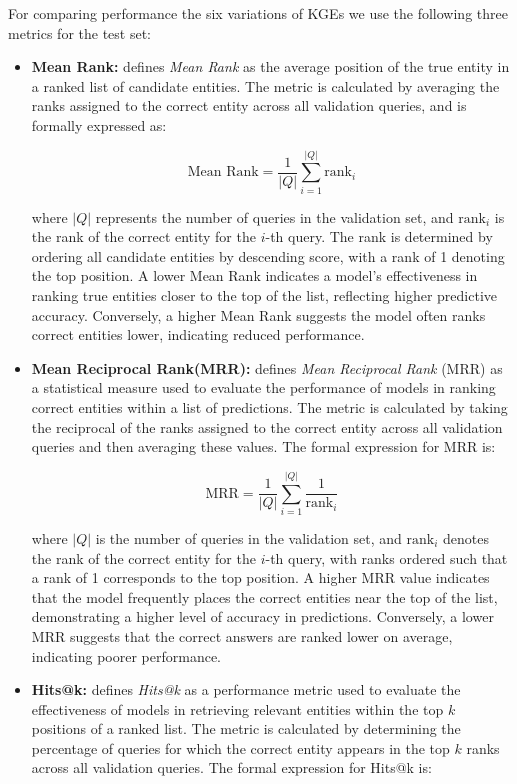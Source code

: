 \documentclass{article}
\begin{document}
For comparing performance the six variations of KGEs we use the following three metrics for the test set:
\begin{itemize}
    \item \textbf{Mean Rank:} \textcite{bordes2013translating} defines \textit{Mean Rank} as the average position of the true entity in a ranked list of candidate entities. The metric is calculated by averaging the ranks assigned to the correct entity across all validation queries, and is formally expressed as:

\[
\text{Mean Rank} = \frac{1}{|Q|} \sum_{i=1}^{|Q|} \text{rank}_i
\]

where \( |Q| \) represents the number of queries in the validation set, and \( \text{rank}_i \) is the rank of the correct entity for the \(i\)-th query. The rank is determined by ordering all candidate entities by descending score, with a rank of 1 denoting the top position. A lower Mean Rank indicates a model's effectiveness in ranking true entities closer to the top of the list, reflecting higher predictive accuracy. Conversely, a higher Mean Rank suggests the model often ranks correct entities lower, indicating reduced performance.
 
    \item \textbf{Mean Reciprocal Rank(MRR):}  \textcite{yang2015embedding} defines \textit{Mean Reciprocal Rank} (MRR) as a statistical measure used to evaluate the performance of models in ranking correct entities within a list of predictions. The metric is calculated by taking the reciprocal of the ranks assigned to the correct entity across all validation queries and then averaging these values. The formal expression for MRR is:

\[
\text{MRR} = \frac{1}{|Q|} \sum_{i=1}^{|Q|} \frac{1}{\text{rank}_i}
\]

where \( |Q| \) is the number of queries in the validation set, and \( \text{rank}_i \) denotes the rank of the correct entity for the \(i\)-th query, with ranks ordered such that a rank of 1 corresponds to the top position. A higher MRR value indicates that the model frequently places the correct entities near the top of the list, demonstrating a higher level of accuracy in predictions. Conversely, a lower MRR suggests that the correct answers are ranked lower on average, indicating poorer performance.

    \item \textbf{Hits@k:} \textcite{yang2015embedding} defines \textit{Hits@k} as a performance metric used to evaluate the effectiveness of models in retrieving relevant entities within the top \( k \) positions of a ranked list. The metric is calculated by determining the percentage of queries for which the correct entity appears in the top \( k \) ranks across all validation queries. The formal expression for Hits@k is:


\end{itemize}
\end{document}
